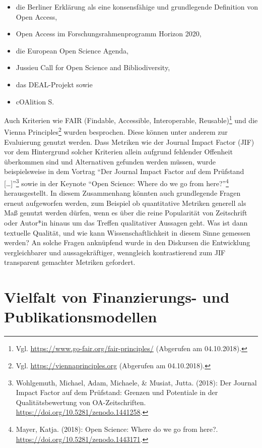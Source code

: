 \documentclass[a4paper,
fontsize=11pt,
oneside,
numbers=noperiodatend,
parskip=half-,
bibliography=totoc,
final
]{scrartcl}
\begin{document}
\begin{itemize}
\item
  die Berliner Erklärung als eine konsensfähige und grundlegende
  Definition von Open Access,
\item
  Open Access im Forschungsrahmenprogramm Horizon 2020,
\item
  die European Open Science Agenda,
\item
  Jussieu Call for Open Science and Bibliodiversity,
\item
  das DEAL-Projekt sowie
\item
  cOAlition S.
\end{itemize}

Auch Kriterien wie FAIR (Findable, Accessible, Interoperable,
Reusable)\footnote{Vgl. \url{https://www.go-fair.org/fair-principles/}
  (Abgerufen am 04.10.2018).} und die Vienna Principles\footnote{Vgl.
  \url{https://viennaprinciples.org} (Abgerufen am 04.10.2018).} wurden
besprochen. Diese können unter anderem zur Evaluierung genutzt werden.
Dass Metriken wie der Journal Impact Factor (JIF) vor dem Hintergrund
solcher Kriterien allein aufgrund fehlender Offenheit überkommen sind
und Alternativen gefunden werden müssen, wurde beispielsweise in dem
Vortrag \enquote{Der Journal Impact Factor auf dem Prüfstand
{[}\ldots{}{]}}\footnote{Wohlgemuth, Michael, Adam, Michaele, \& Musiat,
  Jutta. (2018): Der Journal Impact Factor auf dem Prüfstand: Grenzen
  und Potentiale in der Qualitätsbewertung von OA-Zeitschriften.
  \url{https://doi.org/10.5281/zenodo.1441258}.} sowie in der Keynote
\enquote{Open Science: Where do we go from here?}\footnote{Mayer, Katja.
  (2018): Open Science: Where do we go from here?.
  \url{https://doi.org/10.5281/zenodo.1443171}.} herausgestellt. In
diesem Zusammenhang könnten auch grundlegende Fragen erneut aufgeworfen
werden, zum Beispiel ob quantitative Metriken generell als Maß genutzt
werden dürfen, wenn es über die reine Popularität von Zeitschrift oder
Autor*in hinaus um das Treffen qualitativer Aussagen geht. Was ist dann
textuelle Qualität, und wie kann Wissenschaftlichkeit in diesem Sinne
gemessen werden? An solche Fragen anknüpfend wurde in den Diskursen die
Entwicklung vergleichbarer und aussagekräftiger, wenngleich
kontrastierend zum JIF transparent gemachter Metriken gefordert.

\hypertarget{vielfalt-von-finanzierungs--und-publikationsmodellen}{%
\section{Vielfalt von Finanzierungs- und
Publikationsmodellen}\label{vielfalt-von-finanzierungs--und-publikationsmodellen}}
\end{document}
